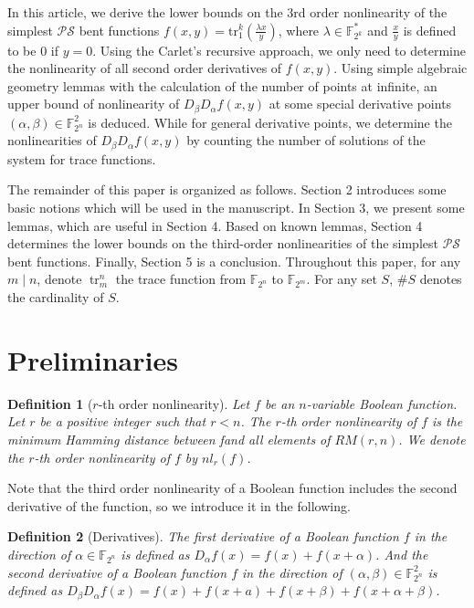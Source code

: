 \documentclass[8pt,oneside]{article}
\newcommand{\0}{\textbf{0}}
\newcommand{\1}{\textbf{1}}
\newcommand{\tr}{\mathrm{tr}_1^k}
\newcommand{\F}{\mathbb{F}}
\newtheorem{definition}{Definition}
\begin{document}
    In this article, we derive the lower bounds on the $ 3 $rd order nonlinearity of the simplest $ \mathcal{PS} $ bent functions $ f(x,y)=\tr\left( \frac{\lambda x}{y} \right) $, where $ \lambda\in\F_{2^k}^* $ and $ \frac{x}{y} $ is defined to be $ 0 $ if $ y=0 $.  
    Using the Carlet's recursive approach, we only need to determine the nonlinearity of all second order derivatives of $ f(x,y) $. 
    Using simple algebraic geometry lemmas with the calculation of the number of points at infinite, an upper bound of nonlinearity of $ D_{\beta}D_{\alpha}f(x,y) $ at some special derivative points $ (\alpha,\beta)\in\F_{2^n}^2 $ is deduced. 
    While for general derivative points, we determine the nonlinearities of $ D_{\beta}D_{\alpha}f(x,y) $ by counting the number of solutions of the system for trace functions. 

    The remainder of this paper is organized as follows.  
    Section 2 introduces some basic notions which will be used in the manuscript. 
    In Section 3, we present some lemmas, which are useful in Section 4.  
    Based on known lemmas, Section 4 determines the lower bounds on the third-order nonlinearities of the simplest $ \mathcal{PS} $ bent functions. 
    Finally, Section 5 is a conclusion. 
    Throughout this paper, for any $ m\mid n $, denote $ \operatorname{tr}_m^n $ the trace function from $ \F_{2^n} $ to $ \F_{2^m} $. For any set $ S $, $ \#S $ denotes the cardinality of $ S $.

\section{Preliminaries}
    \begin{definition}[$ r $-th order nonlinearity]
        Let $ f $ be an $ n $-variable Boolean function. Let $ r $ be a positive integer such that $ r<n $. 
        The $ r $-th order nonlinearity of $ f $ is the minimum Hamming distance between fand all elements of $ RM(r,n) $. We denote the $ r $-th order nonlinearity of $ f $ by $ nl_r(f) $.
    \end{definition}

    Note that the third order nonlinearity of a Boolean function includes the second derivative of the function, so we introduce it in the following.
    \begin{definition}[Derivatives]
        The first derivative of a Boolean function $ f $ in the direction of $ \alpha\in\F_{2^n} $ is defined as $ D_{\alpha}f(x)=f(x)+f(x+\alpha) $. And the second derivative of a Boolean function $ f $ in the direction of $ (\alpha,\beta)\in\F_{2^n}^2 $ is defined as $ D_{\beta}D_{\alpha}f(x)=f(x)+f(x+a)+f(x+\beta)+f(x+\alpha+\beta) $.
    \end{definition}
\end{document}
